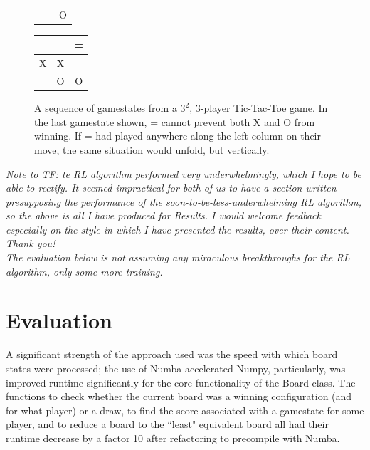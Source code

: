 \documentclass[12pt,a4paper]{article}
\begin{document}
\begin{figure}[htb]
\begin{tabular}{c|c|c}
    \hspace{0.1cm} & \hspace{0.1cm} & O \\ 
\end{tabular}
\hspace{10pt}
\begin{tabular}{c|c|c} %
    \hspace{0.1cm} & \hspace{0.1cm} & = \\ \hline
    X & X & \hspace{0.1cm} \\ \hline
    \hspace{0.1cm} & O & O \\ 
\end{tabular}
\hspace{10pt}
\caption{A sequence of gamestates from a $3^2$, $3$-player Tic-Tac-Toe game. In the last gamestate shown, = cannot prevent both X and O from winning. If = had played anywhere along the left column on their move, the same situation would unfold, but vertically.} \label{fig:alliance}
\end{figure}

\textit{Note to TF: te RL algorithm performed \textit{very} underwhelmingly, which I hope to be able to rectify. It seemed impractical for both of us to have a section written presupposing the performance of the soon-to-be-less-underwhelming RL algorithm, so the above is all I have produced for Results. I would welcome feedback especially on the style in which I have presented the results, over their content. Thank you!\\
The evaluation below is not assuming any miraculous breakthroughs for the RL algorithm, only some more training.}



\section{Evaluation}

A significant strength of the approach used was the speed with which board states were processed; the use of Numba-accelerated Numpy, particularly, was improved runtime significantly for the core functionality of the Board class. 
The functions to check whether the current board was a winning configuration (and for what player) or a draw, to find the score associated with a gamestate for some player, and to reduce a board to the ``least" equivalent board all had their runtime decrease by a factor 10 after refactoring to precompile with Numba. 
\end{document}
